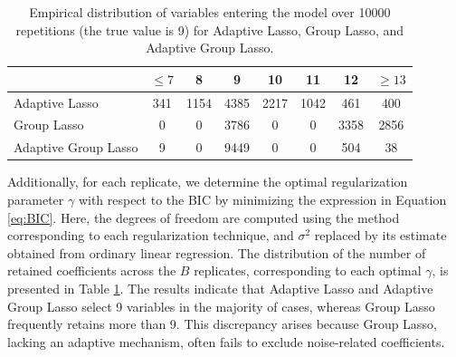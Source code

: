 \documentclass[a4paper, 12pt]{article}
\begin{document}
\begin{table}[h!]
\begin{center}
\caption{Empirical distribution of variables entering the model over 10000 repetitions (the true value is 9) for Adaptive Lasso, Group Lasso, and Adaptive Group Lasso.}
\label{tab:ncomp}
\begin{tabular}{l c c c c c c c}
\hline
 & $\leq7$ & 8 & \textbf{9} & 10 & 11 & 12 & $\geq13$ \\
 \hline
 Adaptive Lasso & 341 & 1154 & 4385 & 2217 & 1042 & 461 & 400 \\  
 Group Lasso & 0 & 0 & 3786 & 0 & 0 & 3358 & 2856 \\ 
 Adaptive Group Lasso & 9 & 0 & 9449 & 0 & 0 & 504 & 38 \\
 \hline
\end{tabular}
\end{center}
\end{table}
%
Additionally, for each replicate, we determine the optimal regularization parameter $\gamma$ with respect to the BIC by minimizing the expression in Equation \eqref{eq:BIC}. Here, the degrees of freedom are computed using the method corresponding to each regularization technique, and  $\sigma^2$ replaced by its estimate obtained from ordinary linear regression.
The distribution of the number of retained coefficients across the $B$ replicates, corresponding to each optimal $\gamma$, is presented in Table \ref{tab:ncomp}.
The results indicate that Adaptive Lasso and Adaptive Group Lasso select 9 variables in the majority of cases, whereas Group Lasso frequently retains more than 9. This discrepancy arises because Group Lasso, lacking an adaptive mechanism, often fails to exclude noise-related coefficients.
\end{document}
